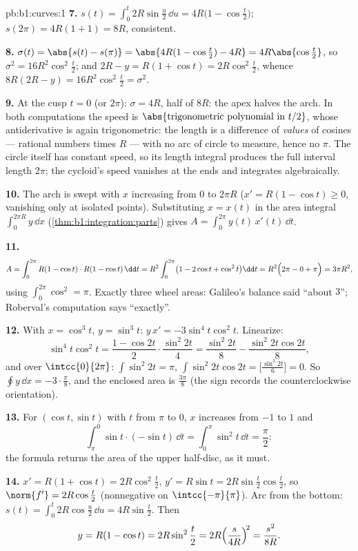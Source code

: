 \begin{solution}{pb:b1:curves:1}
\textbf{7.} $s(t) = \int_0^t 2R\sin\frac u2\,\dd u =
4R\bigl(1 - \cos\frac t2\bigr)$; $s(2\pi) = 4R(1+1) = 8R$,
consistent.

\textbf{8.} $\sigma(t) = \abs{s(t) - s(\pi)} = \abs{4R(1 -
\cos\frac t2) - 4R} = 4R\abs{\cos\frac t2}$, so $\sigma^2 =
16R^2\cos^2\frac t2$; and $2R - y = R(1 + \cos t) =
2R\cos^2\frac t2$, whence $8R(2R - y) = 16R^2\cos^2\frac t2 =
\sigma^2$.

\textbf{9.} At the cusp $t = 0$ (or $2\pi$): $\sigma = 4R$, half
of $8R$: the apex halves the arch. In both computations the
speed is $\abs{\text{trigonometric polynomial in } t/2}$, whose
antiderivative is again trigonometric: the length is a
difference of \emph{values} of cosines --- rational numbers
times $R$ --- with no arc of circle to measure, hence no $\pi$.
The circle itself has constant speed, so its length integral
produces the full interval length $2\pi$; the cycloid's speed
vanishes at the ends and integrates algebraically.

\textbf{10.} The arch is swept with $x$ increasing from $0$ to
$2\pi R$ ($x' = R(1 - \cos t) \geq 0$, vanishing only at
isolated points). Substituting $x = x(t)$ in the area integral
$\int_0^{2\pi R} y\,\dd x$ (\cref{thm:b1:integration:parts})
gives $A = \int_0^{2\pi} y(t)\,x'(t)\,\dd t$.

\textbf{11.}
\[
A = \int_0^{2\pi} R(1 - \cos t)\cdot R(1 - \cos t)\,\dd t
= R^2\int_0^{2\pi}\bigl(1 - 2\cos t + \cos^2 t\bigr)\dd t
= R^2\Bigl(2\pi - 0 + \pi\Bigr) = 3\pi R^2 ,
\]
using $\int_0^{2\pi}\cos^2 = \pi$. Exactly three wheel areas:
Galileo's balance said ``about $3$''; Roberval's computation
says ``exactly''.

\textbf{12.} With $x = \cos^3 t$, $y = \sin^3 t$: $y\,x' =
-3\sin^4 t\cos^2 t$. Linearize:
\[
\sin^4 t\cos^2 t = \frac{1 - \cos 2t}{2}\cdot\frac{\sin^2
2t}{4} = \frac{\sin^2 2t}{8} - \frac{\sin^2 2t\cos 2t}{8} ,
\]
and over $\intcc{0}{2\pi}$: $\int\sin^2 2t = \pi$, $\int \sin^2
2t\cos 2t = \bigl[\frac{\sin^3 2t}{6}\bigr] = 0$. So $\oint
y\,\dd x = -3\cdot\frac\pi8$, and the enclosed area is
$\frac{3\pi}8$ (the sign records the counterclockwise
orientation).

\textbf{13.} For $(\cos t, \sin t)$ with $t$ from $\pi$ to $0$,
$x$ increases from $-1$ to $1$ and
\[
\int_\pi^0 \sin t\cdot(-\sin t)\,\dd t
= \int_0^\pi \sin^2 t\,\dd t = \frac\pi2 :
\]
the formula returns the area of the upper half-disc, as it must.

\textbf{14.} $x' = R(1 + \cos t) = 2R\cos^2\frac t2$, $y' =
R\sin t = 2R\sin\frac t2\cos\frac t2$, so $\norm{f'} =
2R\cos\frac t2$ (nonnegative on $\intcc{-\pi}{\pi}$). Arc from
the bottom: $s(t) = \int_0^t 2R\cos\frac u2\,\dd u =
4R\sin\frac t2$. Then
\[
y = R(1 - \cos t) = 2R\sin^2\frac t2
= 2R\Bigl(\frac{s}{4R}\Bigr)^{\!2} = \frac{s^2}{8R} .
\]


\end{solution}
